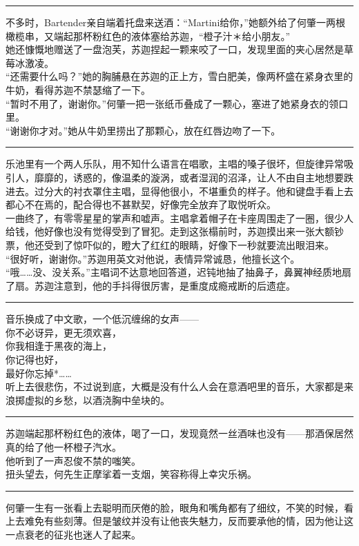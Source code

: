 \documentclass[oneside,11pt]{memoir} %
\begin{document}
\begin{CJK}{UTF8}{gbsn}
\rule{-3pt}{30pt}
    不多时，Bartender亲自端着托盘来送酒：“Martini给你，”她额外给了何肇一两根橄榄串，又端起那杯粉红色的液体塞给苏迦，“橙子汁＊给小朋友。”\\\indent
    她还慷慨地赠送了一盘泡芙，苏迦捏起一颗来咬了一口，发现里面的夹心居然是草莓冰激凌。\\\indent
    “还需要什么吗？”她的胸脯悬在苏迦的正上方，雪白肥美，像两杯盛在紧身衣里的牛奶，看得苏迦不禁瑟缩了一下。\\\indent
    “暂时不用了，谢谢你。”何肇一把一张纸币叠成了一颗心，塞进了她紧身衣的领口里。\\\indent
    “谢谢你才对。”她从牛奶里捞出了那颗心，放在红唇边吻了一下。\\\indent
\rule{-3pt}{30pt}
    乐池里有一个两人乐队，用不知什么语言在唱歌，主唱的嗓子很坏，但旋律异常吸引人，靡靡的，诱惑的，像温柔的漩涡，或者湿润的沼泽，让人不由自主地想要跌进去。过分大的衬衣罩住主唱，显得他很小，不堪重负的样子。他和键盘手看上去都心不在焉的，配合得也不甚默契，好像完全放弃了取悦听众。\\\indent
    一曲终了，有零零星星的掌声和嘘声。主唱拿着帽子在卡座周围走了一圈，很少人给钱，他好像也没有觉得受到了冒犯。走到这张榻前时，苏迦摸出来一张大额钞票，他还受到了惊吓似的，瞪大了红红的眼睛，好像下一秒就要流出眼泪来。\\\indent
    “很好听，谢谢你。”苏迦用英文对他说，表情异常诚恳，他擅长这个。\\\indent
    “哦……没、没关系。”主唱词不达意地回答道，迟钝地抽了抽鼻子，鼻翼神经质地扇了扇。苏迦注意到，他的手抖得很厉害，是重度成瘾戒断的后遗症。\\\indent
\rule{-3pt}{30pt}
    音乐换成了中文歌，一个低沉缠绵的女声——\\\indent
    你不必讶异，更无须欢喜，\\\indent
    你我相逢于黑夜的海上，\\\indent
    你记得也好，\\\indent
    最好你忘掉*……\\\indent
    听上去很悲伤，不过说到底，大概是没有什么人会在意酒吧里的音乐，大家都是来浪掷虚拟的乡愁，以酒浇胸中垒块的。\\\indent
\rule{-3pt}{30pt}
    苏迦端起那杯粉红色的液体，喝了一口，发现竟然一丝酒味也没有——那酒保居然真的给了他一杯橙子汽水。\\\indent
    他听到了一声忍俊不禁的嗤笑。\\\indent
    扭头望去，何先生正摩挲着一支烟，笑容称得上幸灾乐祸。\\\indent
\rule{-3pt}{30pt}
    何肇一生有一张看上去聪明而厌倦的脸，眼角和嘴角都有了细纹，不笑的时候，看上去难免有些刻薄。但是皱纹并没有让他丧失魅力，反而要承他的情，因为他让这一点衰老的征兆也迷人了起来。\\\indent

\end{CJK}
\end{document}
